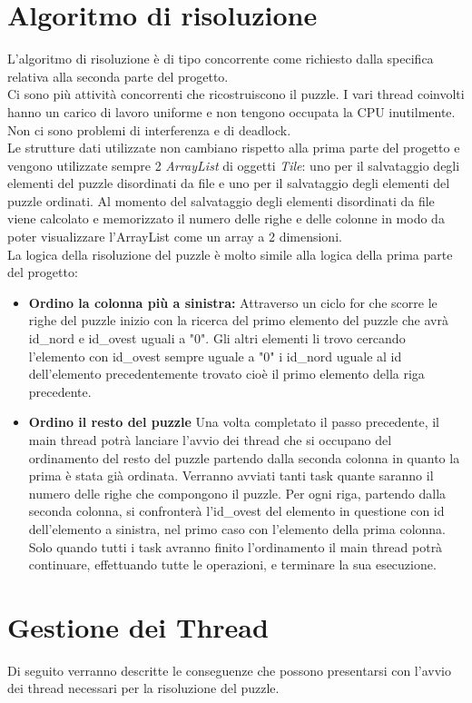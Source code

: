 \documentclass[13pt]{article}
\begin{document}
\section{Algoritmo di risoluzione}
L'algoritmo di risoluzione è di tipo concorrente come richiesto dalla specifica relativa alla seconda parte del progetto.
\\
Ci sono più attività concorrenti che ricostruiscono il puzzle. I vari thread coinvolti hanno un carico di lavoro uniforme e non tengono occupata la CPU inutilmente. Non ci sono problemi di interferenza e di deadlock.
\\
Le strutture dati utilizzate non cambiano rispetto alla prima parte del progetto e vengono utilizzate sempre 2 \textit{ArrayList} di oggetti \textit{Tile}: uno per il salvataggio degli elementi del puzzle disordinati da file e uno per il salvataggio degli elementi del puzzle ordinati. Al momento del salvataggio degli elementi disordinati da file viene calcolato e memorizzato il numero delle righe e delle colonne in modo da poter visualizzare l'ArrayList come un array a 2 dimensioni. 
\\
La logica della risoluzione del puzzle è molto simile alla logica della prima parte del progetto:
\begin{itemize}
	\item \textbf{Ordino la colonna più a sinistra:}
	Attraverso un ciclo for che scorre le righe del puzzle inizio con la ricerca del primo elemento del puzzle che avrà id\_nord e id\_ovest uguali a "0". Gli altri elementi li trovo cercando l'elemento con id\_ovest sempre uguale a "0" i id\_nord uguale al id dell'elemento precedentemente trovato cioè il primo elemento della riga precedente.
	\item \textbf{Ordino il resto del puzzle}
	Una volta completato il passo precedente, il main thread potrà lanciare l'avvio dei thread che si occupano del ordinamento del resto del puzzle partendo dalla seconda colonna in quanto la prima è stata già ordinata. Verranno avviati tanti task quante saranno il numero delle righe che compongono il puzzle. Per ogni riga, partendo dalla seconda colonna, si confronterà l'id\_ovest del elemento in questione con id dell'elemento a sinistra, nel primo caso con l'elemento della prima colonna. Solo quando tutti i task avranno finito l'ordinamento il main thread potrà continuare, effettuando tutte le operazioni, e terminare la sua esecuzione. 
\end{itemize}
 
\newpage
\section{Gestione dei Thread}
Di seguito verranno descritte le conseguenze che possono presentarsi con l'avvio dei thread necessari per la risoluzione del puzzle.
\end{document}
